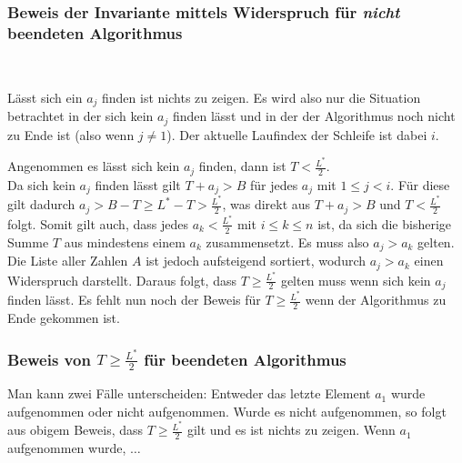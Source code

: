 \documentclass[a4paper]{article}
\begin{document}
		\subsubsection*{Beweis der Invariante mittels Widerspruch für \textit{nicht} beendeten Algorithmus}
		\vspace{-1.5\baselineskip}
		~\begin{note}
			Lässt sich ein $a_j$ finden ist nichts zu zeigen. Es wird also nur die Situation betrachtet in der sich kein $a_j$ finden lässt und in der der Algorithmus noch nicht zu Ende ist (also wenn $j\neq1$). Der aktuelle Laufindex der Schleife ist dabei $i$.
		\end{note}
		Angenommen es lässt sich kein $a_j$ finden, dann ist $T<\frac{L^*}{2}$.\\
		Da sich kein $a_j$ finden lässt gilt $T+a_j>B$ für jedes $a_j$ mit $1\leq j< i$. Für diese gilt dadurch $a_j>B-T\geq L^*-T>\frac{L^*}{2}$, was direkt aus $T+a_j>B$ und $T<\frac{L^*}{2}$ folgt. Somit gilt auch, dass jedes $a_k<\frac{L^*}{2}$ mit $i\leq k\leq n$ ist, da sich die bisherige Summe $T$ aus mindestens einem $a_k$ zusammensetzt. Es muss also $a_j>a_k$ gelten.\n
		Die Liste aller Zahlen $A$ ist jedoch aufsteigend sortiert, wodurch $a_j>a_k$ einen Widerspruch darstellt. Daraus folgt, dass $T\geq \frac{L^*}{2}$ gelten muss wenn sich kein $a_j$ finden lässt.\n
		Es fehlt nun noch der Beweis für $T\geq\frac{L^*}{2}$ wenn der Algorithmus zu Ende gekommen ist.
		\subsubsection*{Beweis von $T\geq\frac{L^*}{2}$ für beendeten Algorithmus}
		Man kann zwei Fälle unterscheiden: Entweder das letzte Element $a_1$ wurde aufgenommen oder nicht aufgenommen. Wurde es nicht aufgenommen, so folgt aus obigem Beweis, dass $T\geq \frac{L^*}{2}$ gilt und es ist nichts zu zeigen.\n
		Wenn $a_1$ aufgenommen wurde, $\dots$
	\section{}
\end{document}
